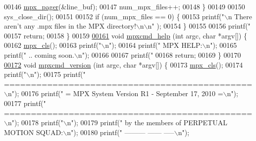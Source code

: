 \begin{DoxyCode}
{{{{{{00146                 \hyperlink{mpx__util_8c_a9e59881f10bd91d7255f18f205e101e6}{mpx_pager}(&line\_buf);
00147                 num\_mpx\_files++;
00148         \}
00149 
00150         sys\_close\_dir();
00151 
00152         \textcolor{keywordflow}{if} (num\_mpx\_files == 0) \{
00153                 printf(\textcolor{stringliteral}{"\(\backslash\)n There aren't any .mpx files in the MPX directory!\(\backslash\)n\(\backslash\)n"
      });
00154         \}
00155 
00156         printf(\textcolor{stringliteral}{"%
00157         \textcolor{keywordflow}{return};
00158 \}
00159 
\hypertarget{mpx__cmd_8c_source_l00161}{}\hyperlink{mpx__cmd_8h_ae9b1349cfcfc34815e87cae5330660e8}{00161} \textcolor{keywordtype}{void} \hyperlink{mpx__cmd_8c_ae9b1349cfcfc34815e87cae5330660e8}{mpxcmd_help} (\textcolor{keywordtype}{int} argc, \textcolor{keywordtype}{char} *argv[]) \{
00162         \hyperlink{mpx__util_8c_a8cf3281978ba1652fd5d643e1a41f70b}{mpx_cls}();
00163         printf(\textcolor{stringliteral}{"\(\backslash\)n"});
00164         printf(\textcolor{stringliteral}{"  MPX HELP:\(\backslash\)n"});
00165         printf(\textcolor{stringliteral}{" .. coming soon.\(\backslash\)n"});
00166 
00167         printf(\textcolor{stringliteral}{"%
00168         \textcolor{keywordflow}{return};
00169 \}
00170 
\hypertarget{mpx__cmd_8c_source_l00172}{}\hyperlink{mpx__cmd_8h_a70a1ce3926ea7c41321ab42b4161df0d}{00172} \textcolor{keywordtype}{void} \hyperlink{mpx__cmd_8c_a70a1ce3926ea7c41321ab42b4161df0d}{mpxcmd_version} (\textcolor{keywordtype}{int} argc, \textcolor{keywordtype}{char} *argv[]) \{
00173         \hyperlink{mpx__util_8c_a8cf3281978ba1652fd5d643e1a41f70b}{mpx_cls}();
00174         printf(\textcolor{stringliteral}{"\(\backslash\)n"});
00175         printf(\textcolor{stringliteral}{"  ==============================================\(\backslash\)n"});
00176         printf(\textcolor{stringliteral}{"  = MPX System Version R1 - September 17, 2010 =\(\backslash\)n"});
00177         printf(\textcolor{stringliteral}{"  ==============================================\(\backslash\)n"});
00178         printf(\textcolor{stringliteral}{"\(\backslash\)n"});
00179         printf(\textcolor{stringliteral}{"      by the members of PERPETUAL MOTION SQUAD:\(\backslash\)n"});
00180         printf(\textcolor{stringliteral}{"                        --------- ------ -----\(\backslash\)n"});
}}}}}}}}
\end{DoxyCode}
